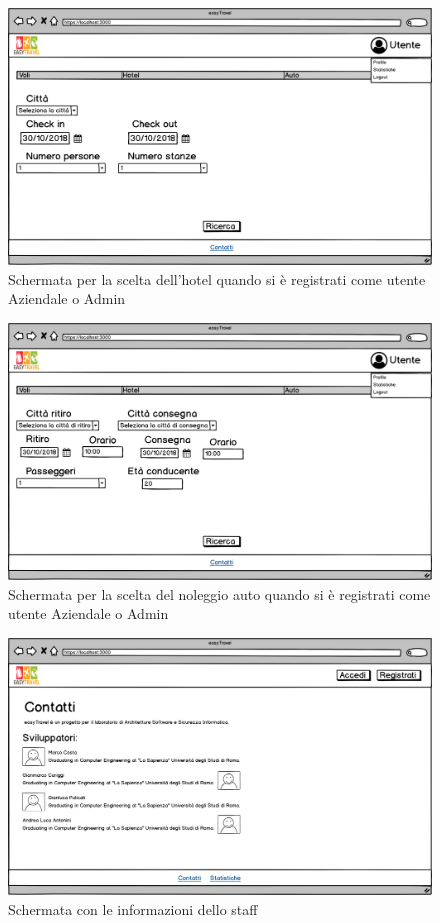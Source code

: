 \documentclass[11pt]{article}
\begin{document}
\begin{figure}[!ht]
	\includegraphics[width=1\textwidth]{./Mockup/Hotel-aziendale-admin} %
	\caption{Schermata per la scelta dell'hotel quando si è registrati come utente Aziendale o Admin}
	\label{fig:hotelaziendaleadmin}
\end{figure}

\begin{figure}[!ht]
	\includegraphics[width=1\textwidth]{./Mockup/Auto-aziendale-admin} %
	\caption{Schermata per la scelta del noleggio auto quando si è registrati come utente Aziendale o Admin}
	\label{fig:autoaziendaleadmin}
\end{figure}

\begin{figure}[!ht]
	\includegraphics[width=1\textwidth]{./Mockup/Contatti-non-registrato} %
	\caption{Schermata con le informazioni dello staff}
	\label{fig:contattinonreg}
\end{figure}
\end{document}
